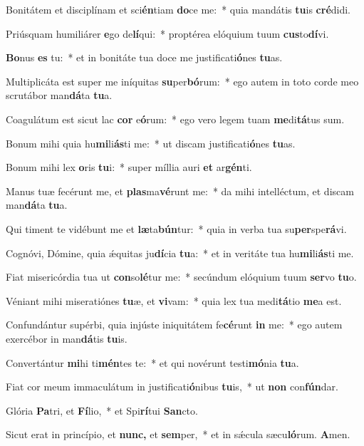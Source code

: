 \item Bonitátem et disciplínam et sci\textbf{én}tiam \textbf{do}ce me:~* quia mandátis \textbf{tu}is \textbf{cré}didi.
\item Priúsquam humiliárer \textbf{e}go de\textbf{lí}qui:~* proptérea elóquium tuum \textbf{cus}to\textbf{dí}vi.
\item \textbf{Bo}nus \textbf{es} tu:~* et in bonitáte tua doce me justificati\textbf{ó}nes \textbf{tu}as.
\item Multiplicáta est super me iníquitas \textbf{su}per\textbf{bó}rum:~* ego autem in toto corde meo scrutábor man\textbf{dá}ta \textbf{tu}a.
\item Coagulátum est sicut lac \textbf{cor} e\textbf{ó}rum:~* ego vero legem tuam \textbf{me}di\textbf{tá}tus sum.
\item Bonum mihi quia hu\textbf{mi}li\textbf{ás}ti me:~* ut discam justificati\textbf{ó}nes \textbf{tu}as.
\item Bonum mihi lex \textbf{o}ris \textbf{tu}i:~* super míllia auri \textbf{et} ar\textbf{gén}ti.
\item Manus tuæ fecérunt me, et \textbf{plas}ma\textbf{vé}runt me:~* da mihi intelléctum, et discam man\textbf{dá}ta \textbf{tu}a.
\item Qui timent te vidébunt me et \textbf{læ}ta\textbf{bún}tur:~* quia in verba tua su\textbf{per}spe\textbf{rá}vi.
\item Cognóvi, Dómine, quia ǽquitas ju\textbf{dí}cia \textbf{tu}a:~* et in veritáte tua hu\textbf{mi}li\textbf{ás}ti me.
\item Fiat misericórdia tua ut \textbf{con}so\textbf{lé}tur me:~* secúndum elóquium tuum \textbf{ser}vo \textbf{tu}o.
\item Véniant mihi miseratiónes \textbf{tu}æ, et \textbf{vi}vam:~* quia lex tua medi\textbf{tá}tio \textbf{me}a est.
\item Confundántur supérbi, quia injúste iniquitátem fe\textbf{cé}runt \textbf{in} me:~* ego autem exercébor in man\textbf{dá}tis \textbf{tu}is.
\item Convertántur \textbf{mi}hi ti\textbf{mén}tes te:~* et qui novérunt testi\textbf{mó}nia \textbf{tu}a.
\item Fiat cor meum immaculátum in justificati\textbf{ó}nibus \textbf{tu}is,~* ut \textbf{non} con\textbf{fún}dar.
\item Glória \textbf{Pa}tri, et \textbf{Fí}lio,~* et Spi\textbf{rí}tui \textbf{San}cto.
\item Sicut erat in princípio, et \textbf{nunc,} et \textbf{sem}per,~* et in sǽcula sæcu\textbf{ló}rum. \textbf{A}men.